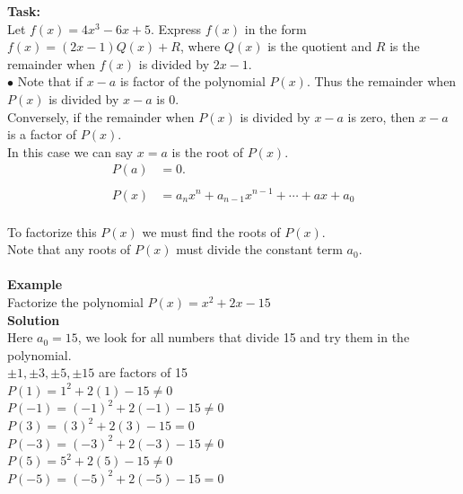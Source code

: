 \documentclass[11pt,a4paper]{article}
\begin{document}
\textbf{Task:}\\
Let $f(x)=4x^3-6x+5$. Express $f(x)$ in the form $f(x)=(2x-1)Q(x)+R$, where $Q(x)$ is the quotient and $R$ is the remainder when $f(x)$ is divided by $2x-1$.\\

$\bullet$ Note that if $x-a$ is factor of the polynomial $P(x)$. Thus the remainder when $P(x)$ is divided by $x-a$ is 0.\\
Conversely, if the remainder when $P(x)$ is divided by $x-a$ is zero, then $x-a$ is a factor of $P(x)$.\\

In  this case we can say $x=a$ is the root of $P(x)$.\\
\begin{align*}
P(a) & =0.\\\\
P(x) & = a_nx^n+a_{n-1}x^{n-1}+\cdots +ax+a_0\\
\end{align*}

To factorize this $P(x)$ we must find the roots of $P(x)$.\\

Note that any roots of $P(x)$ must divide the constant term $a_0$.\\\\

\textbf{Example}\\
Factorize the polynomial $P(x)=x^2+2x-15$\\

\textbf{Solution}\\
Here $a_0=15$, we look for all numbers that divide 15 and try them in the polynomial.\\

$\pm 1, \pm 3, \pm 5, \pm 15$ are factors of 15\\

$P(1)=1^2+2(1)-15\neq 0$\\

$P(-1)=(-1)^2+2(-1)-15\neq 0$\\

$P(3)=(3)^2+2(3)-15 = 0$\\

$P(-3) =(-3)^2+2(-3)-15\neq 0$\\

$P(5)=5^2+2(5)-15\neq 0$\\

$P(-5)=(-5)^2+2(-5)-15=0$\\
\end{document}
